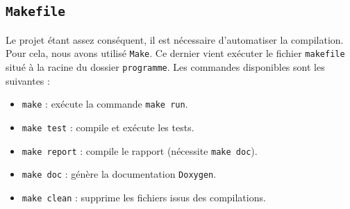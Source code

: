 \subsection{\texttt{Makefile}}

Le projet étant assez conséquent, il est nécessaire d'automatiser la compilation.
Pour cela, nous avons utilisé \texttt{Make}.
Ce dernier vient exécuter le fichier \texttt{makefile} situé à la racine du dossier \texttt{programme}.
Les commandes disponibles sont les suivantes :
\begin{itemize}
    \item \texttt{make} : exécute la commande \texttt{make run}.
    \item \texttt{make test} : compile et exécute les tests.
    \item \texttt{make report} : compile le rapport (nécessite \texttt{make doc}).
    \item \texttt{make doc} : génère la documentation \texttt{Doxygen}.
    \item \texttt{make clean} : supprime les fichiers issus des compilations.
\end{itemize}